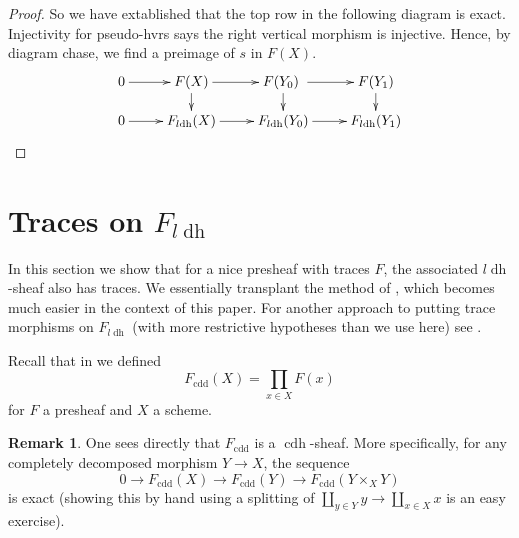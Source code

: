 \documentclass[10pt]{amsart}
\theoremstyle{definition}
\newtheorem{rema}[theo]{Remark}
\newcommand{\fpsl}{{\operatorname{fps\!}l'}}
\newcommand{\cdh}{{{\operatorname{cdh}}}}
\newcommand{\ldh}{{l{\operatorname{dh}}}}
\newcommand{\uh}{\operatorname{uh}}
\newcommand{\cdd}{{\operatorname{cdd}}}
\begin{document}
\begin{proof}
So we have extablished that the top row in the following diagram is exact. Injectivity for pseudo-hvrs says the right vertical morphism is injective. Hence, by diagram chase, we find a preimage of $s$ in $F(X)$.
\[ \xymatrix@R=12pt{
0 \ar[r] & F(X) \ar[r] \ar[d] & F(Y_0) \ar[r] \ar[d] & F(Y_1) \ar[d] \\
0 \ar[r] & F_\ldh(X) \ar[r] & F_\ldh(Y_0) \ar[r] & F_\ldh(Y_1)
} \]
\end{proof}

\section{Traces on $F_\ldh$} \label{sec:tracesFldh}

In this section we show that for a nice presheaf with traces $F$, the associated $\ldh$-sheaf also has traces. We essentially transplant the method of \cite[Thm.3.5.5]{Kel12}, which becomes much easier in the context of this paper. For another approach to putting trace morphisms on $F_\ldh$ (with more restrictive hypotheses than we use here) see \cite{Kel17}.

Recall that in \cite[\S 3.5]{Kel12} we defined 
\[ F_\cdd(X) = \prod_{x \in X} F(x) \]
for $F$ a presheaf and $X$ a scheme.

\begin{rema} \label{rema:cddbasic}
One sees directly that $F_\cdd$ is a $\cdh$-sheaf. More specifically, for any completely decomposed morphism $Y \to X$, the sequence
\[ 0 \to F_\cdd(X) \to F_\cdd(Y) \to F_\cdd(Y \times_X Y) \]
is exact (showing this by hand using a splitting of $\amalg_{y \in Y}y \to \amalg_{x \in X}x$ is an easy exercise).
%
\end{rema}
\end{document}
